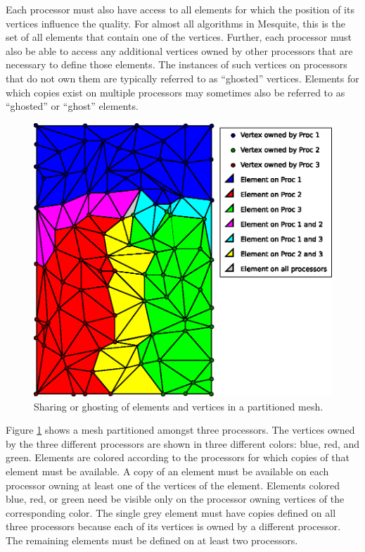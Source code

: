 Each processor must also have access to all elements for which the position of its vertices influence the quality.  For almost all algorithms in Mesquite, this is the set of all elements that contain one of the vertices.  Further, each processor must also be able to access any additional vertices owned by other processors that are necessary to define those elements.  The instances of such vertices on processors that do not own them are typically referred to as ``ghosted'' vertices.  Elements for which copies exist on multiple processors may sometimes also be referred to as ``ghosted'' or ``ghost'' elements.

\begin{figure}[htbp]
\begin{center}
    \includegraphics{parallel_mesh.eps}
    \caption{Sharing or ghosting of elements and vertices in a partitioned mesh.}
    \label{fig:parallel_mesh}
\end{center}
\end{figure}

Figure \ref{fig:parallel_mesh} shows a mesh partitioned amongst three processors.  The vertices owned by the three different processors are shown in three different colors: blue, red, and green.  Elements are colored according to the processors for which copies of that element must be available.  A copy of an element must be available on each processor owning at least one of the vertices of the element.  Elements colored blue, red, or green need be visible only on the processor owning vertices of the corresponding color. The single grey element must have copies defined on all three processors because each of its vertices is owned by a different processor.  The remaining elements must be defined on at least two processors.  


